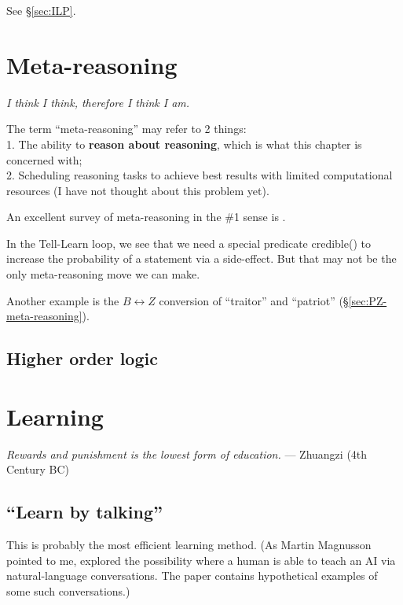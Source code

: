 \documentclass[a4paper]{report}
\begin{document}
See \S\ref{sec:ILP}.

\chapter{Meta-reasoning}
\label{ch:meta-reasoning}
\begin{flushright}
\emph{I think I think, therefore I think I am.}
\end{flushright}
\minitoc

The term ``meta-reasoning'' may refer to 2 things:\\
1. The ability to \textbf{reason about reasoning}, which is what this chapter is concerned with;\\
2. Scheduling reasoning tasks to achieve best results with limited computational resources (I have not thought about this problem yet).

An excellent survey of meta-reasoning in the \#1 sense is \citep*{Constantini2002}.

In the Tell-Learn loop, we see that we need a special predicate credible() to increase the probability of a statement via a side-effect.  But that may not be the only meta-reasoning move we can make.

Another example is the $B \leftrightarrow Z$ conversion of ``traitor'' and ``patriot'' (\S\ref{sec:PZ-meta-reasoning}).

\section{Higher order logic}

\chapter{Learning}
\label{ch:machine-learning}
\begin{flushright}
\emph{Rewards and punishment is the lowest form of education.} --- Zhuangzi (4th Century BC)
\end{flushright}
\minitoc

\section{``Learn by talking''}
\label{sec:learn-by-talking}

This is probably the most efficient learning method.  (As Martin Magnusson pointed to me, \citep*{Perlis1996} explored the possibility where a human is able to teach an AI via natural-language conversations.  The paper contains hypothetical examples of some such conversations.)
\end{document}
